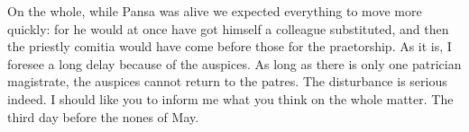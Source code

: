  On the whole, while Pansa was alive we expected everything to move more quickly: for he would at once have got himself a colleague substituted, and then the priestly comitia would have come before those for the praetorship. As it is, I foresee a long delay because of the auspices. As long as there is only one patrician magistrate, the auspices cannot return to the patres. The disturbance is serious indeed. I should like you to inform me what you think on the whole matter. The third day before the nones of May.
